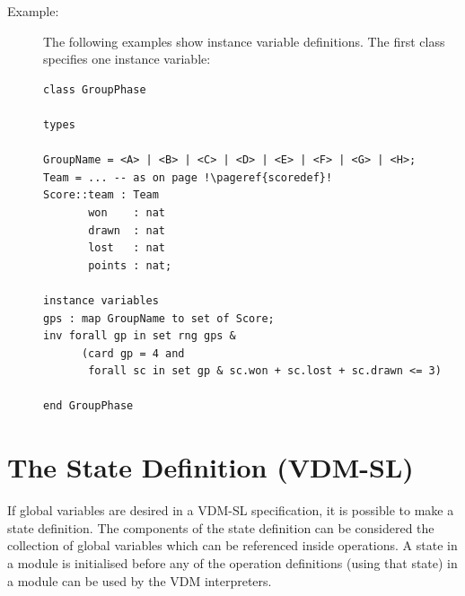 \documentclass{overturerepchap}
\begin{document}
\begin{description}

\item[Example:]

The following examples show instance variable definitions. The first
class specifies one instance variable: 
  \begin{lstlisting}
class GroupPhase

types

GroupName = <A> | <B> | <C> | <D> | <E> | <F> | <G> | <H>;
Team = ... -- as on page !\pageref{scoredef}!
Score::team : Team
       won    : nat
       drawn  : nat
       lost   : nat
       points : nat;

instance variables
gps : map GroupName to set of Score;
inv forall gp in set rng gps & 
      (card gp = 4 and
       forall sc in set gp & sc.won + sc.lost + sc.drawn <= 3)

end GroupPhase
  \end{lstlisting}
\end{description}

\section{The State Definition (VDM-SL)}\label{statedef}

If global variables are desired in a VDM-SL specification, it is possible to make
a state definition. The components of the state definition can be
considered the collection of global variables which can be referenced
inside operations. A state in a module is initialised before any of the
operation definitions (using that state) in a module can be used by
the VDM interpreters.
\end{document}
